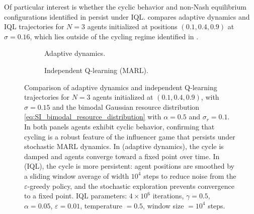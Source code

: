 \documentclass{article}
\begin{document}
            Of particular interest is whether the cyclic behavior and non-Nash equilibrium configurations identified in  persist under IQL.  compares adaptive dynamics and IQL trajectories for $N = 3$ agents initialized at positions $(0.1, 0.4, 0.9)$ at $\sigma = 0.16$, which lies outside of the cycling regime identified in .

            \begin{figure}[ht!]
                \centering
                \begin{subfigure}[b]{.47\linewidth}
                    
                    \caption{Adaptive dynamics.}
                    \label{fig:marl_vs_adaptive:a}
                \end{subfigure}
                \begin{subfigure}[b]{.47\linewidth}
                    
                    \caption{Independent Q-learning (MARL).}
                    \label{fig:marl_vs_adaptive:b}
                \end{subfigure}
                \caption{Comparison of adaptive dynamics and independent Q-learning trajectories for $N = 3$ agents initialized at $(0.1, 0.4, 0.9)$, with $\sigma = 0.15$ and the bimodal Gaussian resource distribution \cref{eq:SI_bimodal_resource_distribution} with $\alpha = 0.5$ and $\sigma_r = 0.1$. In both panels agents exhibit cyclic behavior, confirming that cycling is a robust feature of the influencer game that persists under stochastic MARL dynamics. In  (adaptive dynamics), the cycle is damped and agents converge toward a fixed point over time. In  (IQL), the cycle is more persistent: agent positions are smoothed by a sliding window average of width $10^4$ steps to reduce noise from the $\varepsilon$-greedy policy, and the stochastic exploration prevents convergence to a fixed point. IQL parameters: $4 \times 10^6$ iterations, $\gamma = 0.5$, $\alpha = 0.05$, $\varepsilon = 0.01$, temperature $= 0.5$, window size $= 10^4$ steps.}
                \label{fig:marl_vs_adaptive}
            \end{figure}
\end{document}
